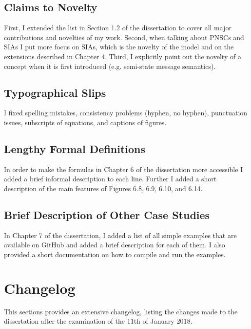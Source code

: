 \documentclass{article}
\begin{document}
\subsection{Claims to Novelty}
First, I extended the list in Section 1.2 of the dissertation to cover all major contributions and novelties of my work.
Second, when talking about PNSCs and SIAs I put more focus on SIAs, which is the novelty of the model and on the extensions described in Chapter 4.
Third, I explicitly point out the novelty of a concept when it is first introduced (e.g. semi-state message semantics).

\subsection{Typographical Slips}
I fixed spelling mistakes, consistency problems (hyphen, no hyphen), punctuation issues, subscripts of equations, and captions of figures.

\subsection{Lengthy Formal Definitions}
In order to make the formulas in Chapter 6 of the dissertation more accessible I added a brief informal description to each line.
Further I added a short description of the main features of Figures 6.8, 6.9, 6.10, and 6.14.

\subsection{Brief Description of Other Case Studies}
In Chapter 7 of the dissertation, I added a list of all simple examples that are available on GitHub and added a brief description for each of them.
I also provided a short documentation on how to compile and run the examples.


\section{Changelog}
\label{changelog}
This sections provides an extensive changelog, listing the changes made to the dissertation after the examination of the 11th of January 2018.
\end{document}
